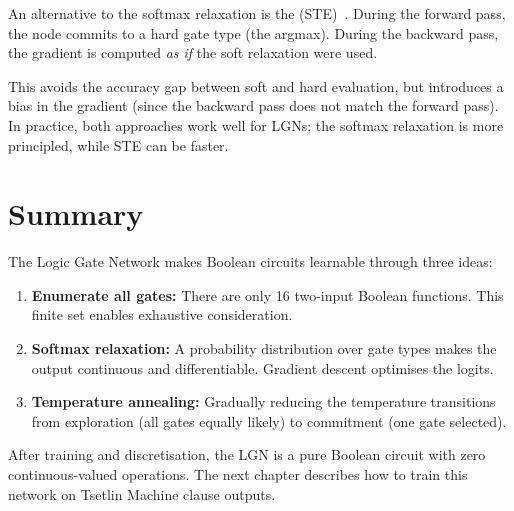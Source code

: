 An alternative to the softmax relaxation is the  (STE)~\cite{bengio2013ste}. During the forward pass, the node
commits to a hard gate type (the argmax). During the backward pass, the
gradient is computed \emph{as if} the soft relaxation were used.

This avoids the accuracy gap between soft and hard evaluation, but
introduces a bias in the gradient (since the backward pass does not
match the forward pass). In practice, both approaches work well for
LGNs; the softmax relaxation is more principled, while STE can be
faster.


\section{Summary}
\label{sec:ch8-summary}

The Logic Gate Network makes Boolean circuits learnable through three
ideas:
\begin{enumerate}
  \item \textbf{Enumerate all gates:} There are only 16 two-input
    Boolean functions. This finite set enables exhaustive
    consideration.
  \item \textbf{Softmax relaxation:} A probability distribution over
    gate types makes the output continuous and differentiable.
    Gradient descent optimises the logits.
  \item \textbf{Temperature annealing:} Gradually reducing the
    temperature transitions from exploration (all gates equally
    likely) to commitment (one gate selected).
\end{enumerate}

After training and discretisation, the LGN is a pure Boolean circuit
with zero continuous-valued operations. The next chapter describes
how to train this network on Tsetlin Machine clause outputs.
